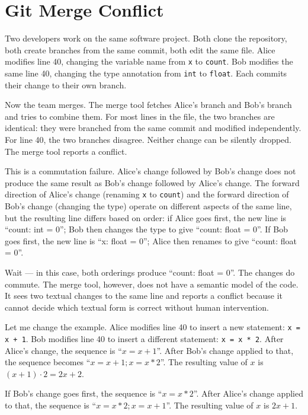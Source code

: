 \section{Git Merge Conflict}
\label{se:git-merge-conflict}

Two developers work on the same software project. Both clone the
repository, both create branches from the same commit, both edit the
same file. Alice modifies line 40, changing the variable name from
\texttt{x} to \texttt{count}. Bob modifies the same line 40,
changing the type annotation from \texttt{int} to \texttt{float}.
Each commits their change to their own branch.

Now the team merges. The merge tool fetches Alice's branch and Bob's
branch and tries to combine them. For most lines in the file, the two
branches are identical: they were branched from the same commit and
modified independently. For line 40, the two branches disagree.
Neither change can be silently dropped. The merge tool reports a
conflict.

This is a commutation failure. Alice's change followed by Bob's
change does not produce the same result as Bob's change followed by
Alice's change. The forward direction of Alice's change (renaming
\texttt{x} to \texttt{count}) and the forward direction of Bob's
change (changing the type) operate on different aspects of the same
line, but the resulting line differs based on order: if Alice goes
first, the new line is ``count: int = 0''; Bob then changes the
type to give ``count: float = 0''. If Bob goes first, the new line
is ``x: float = 0''; Alice then renames to give ``count: float = 0''.

Wait --- in this case, both orderings produce ``count: float = 0''.
The changes do commute. The merge tool, however, does not have a
semantic model of the code. It sees two textual changes to the same
line and reports a conflict because it cannot decide which textual
form is correct without human intervention.

Let me change the example. Alice modifies line 40 to insert a new
statement: \texttt{x = x + 1}. Bob modifies line 40 to insert a
different statement: \texttt{x = x * 2}. After Alice's change, the
sequence is ``$x = x + 1$''. After Bob's change applied to that,
the sequence becomes ``$x = x + 1; x = x * 2$''. The resulting value
of $x$ is $(x + 1) \cdot 2 = 2x + 2$.

If Bob's change goes first, the sequence is ``$x = x * 2$''. After
Alice's change applied to that, the sequence is ``$x = x * 2; x = x
+ 1$''. The resulting value of $x$ is $2x + 1$.

